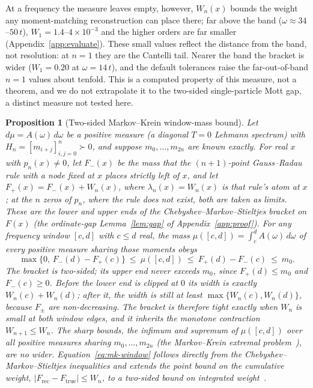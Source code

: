 \documentclass[submission, PhysCore]{SciPost}
\newtheorem{proposition}{Proposition}
\begin{document}
\begin{appendix}
At a frequency the measure leaves empty, however, $W_n(x)$ bounds the weight any moment-matching reconstruction can place there; far above the band ($\omega\approx34$--$50\,t$), $W_1=1.4$--$4\times10^{-3}$ and the higher orders are far smaller (Appendix~\ref{app:evaluate}). These small values reflect the distance from the band, not resolution: at $n=1$ they are the Cantelli tail. Nearer the band the bracket is wider ($W_1=0.20$ at $\omega=14\,t$), and the default tolerances raise the far-out-of-band $n=1$ values about tenfold. This is a computed property of this measure, not a theorem, and we do not extrapolate it to the two-sided single-particle Mott gap, a distinct measure not tested here.

\begin{proposition}[Two-sided Markov--Krein window-mass bound]
\label{prop:markovkrein}
Let $d\mu=A(\omega)\,d\omega$ be a positive measure (a diagonal $T=0$ Lehmann spectrum) with $H_n=[m_{i+j}]_{i,j=0}^{n}\succ0$, and suppose $m_0,\dots,m_{2n}$ are known exactly. For real $x$ with $p_n(x)\neq0$, let $F_-(x)$ be the mass that the $(n{+}1)$-point Gauss--Radau rule with a node fixed at $x$ places strictly left of $x$, and let $F_+(x)=F_-(x)+W_n(x)$, where $\lambda_n(x)=W_n(x)$ is that rule's atom at $x$; at the $n$ zeros of $p_n$, where the rule does not exist, both are taken as limits. These are the lower and upper ends of the Chebyshev--Markov--Stieltjes bracket on $F(x)$ (the ordinate-gap Lemma~\ref{lem:gap} of Appendix~\ref{app:proof}). For any frequency window $[c,d]$ with $c\le d$ real, the mass $\mu([c,d])=\int_c^d A(\omega)\,d\omega$ of \emph{every} positive measure sharing those moments obeys
\begin{equation}
\max\{0,\,F_-(d)-F_+(c)\}\ \le\ \mu([c,d])\ \le\ F_+(d)-F_-(c)\ \le\ m_0 .
\label{eq:mk-window}
\end{equation}
The bracket is two-sided; its upper end never exceeds $m_0$, since $F_+(d)\le m_0$ and $F_-(c)\ge0$. Before the lower end is clipped at $0$ its width is exactly $W_n(c)+W_n(d)$; after it, the width is still at least $\max\{W_n(c),W_n(d)\}$, because $F_\pm$ are non-decreasing. The bracket is therefore tight exactly when $W_n$ is small at both window edges, and it inherits the monotone contraction $W_{n+1}\le W_n$. The sharp bounds, the infimum and supremum of $\mu([c,d])$ over all positive measures sharing $m_0,\dots,m_{2n}$ (the Markov--Krein extremal problem~\cite{KreinNudelman1977}), are no wider. Equation~\eqref{eq:mk-window} follows directly from the Chebyshev--Markov--Stieltjes inequalities and extends the point bound on the cumulative weight, $|F_{\mathrm{rec}}-F_{\mathrm{true}}|\le W_n$, to a two-sided bound on integrated weight~\cite{KreinNudelman1977,KarlinStudden1966,DetteStudden1997,GM2010}.
\end{proposition}


\end{appendix}
\end{document}

